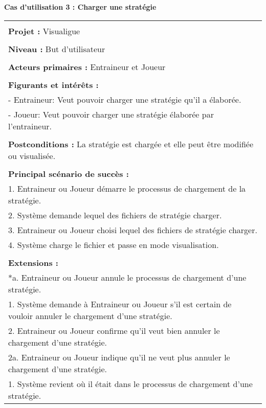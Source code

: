 \newpage
\begin{flushleft}
	\textbf{Cas d'utilisation 3 : Charger une stratégie}\\
\end{flushleft}
\begin{tabular}{|p{16cm}|}
	\hline
	\\
	\textbf{Projet :} Visualigue\\
	\\
	\textbf{Niveau :} But d'utilisateur\\
	\\
	\textbf{Acteurs primaires :} Entraineur et Joueur\\
	\\
	\textbf{Figurants et intérêts :} \\
	- Entraineur: Veut pouvoir charger une stratégie qu'il a élaborée.\\
	- Joueur: Veut pouvoir charger une stratégie élaborée par l'entraineur.\\
	\\
	\textbf{Postconditions :} La stratégie est chargée et elle peut être modifiée ou visualisée.\\
	\\
	\textbf{Principal scénario de succès :}\\
	1. Entraineur ou Joueur démarre le processus de chargement de la stratégie.\\
	2. Système demande lequel des fichiers de stratégie charger.\\
	3. Entraineur ou Joueur choisi lequel des fichiers de stratégie charger.\\
	4. Système charge le fichier et passe en mode visualisation.\\
	\\
	\textbf{Extensions :}\\
	*a. Entraineur ou Joueur annule le processus de chargement d'une stratégie.\\
	\hspace{1cm}1. Système demande à Entraineur ou Joueur s'il est certain de vouloir annuler le chargement d'une stratégie.\\
	\hspace{1cm}2. Entraineur ou Joueur confirme qu'il veut bien annuler le chargement d'une stratégie.\\
	\hspace{2cm}2a. Entraineur ou Joueur indique qu'il ne veut plus annuler le chargement d'une stratégie.\\
	\hspace{3cm}1. Système revient où il était dans le processus de chargement d'une stratégie.\\

\end{tabular}
